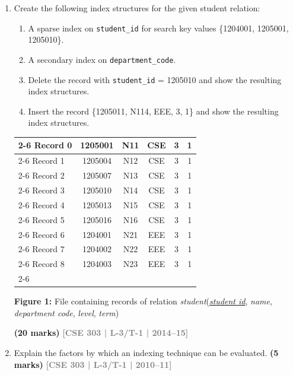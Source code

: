 \documentclass[12pt]{article}
\newcommand{\yr}[1]{\hfill\textcolor{gray}{\small\textbf{[#1]}}}
\newcommand{\mk}[1]{\textcolor{orange!70!black}{\small\textbf{(#1 marks)}}}
\begin{document}
\begin{enumerate}
\item Create the following index structures for the given student relation:
\begin{enumerate}
  \item A sparse index on \texttt{student\_id} for search key values \{1204001, 1205001, 1205010\}.
  \item A secondary index on \texttt{department\_code}.
  \item Delete the record with \texttt{student\_id} = 1205010 and show the resulting index structures.
  \item Insert the record \{1205011, N114, EEE, 3, 1\} and show the resulting index structures.
\end{enumerate}

\begin{center}
  \renewcommand{\arraystretch}{1.3} %
    \begin{tabular}{l |c|c|c|c|c|}
        \cline{2-6}
        Record 0 & 1205001 & N11 & CSE & 3 & 1 \\
        \cline{2-6}
        Record 1 & 1205004 & N12 & CSE & 3 & 1 \\
        \cline{2-6}
        Record 2 & 1205007 & N13 & CSE & 3 & 1 \\
        \cline{2-6}
        Record 3 & 1205010 & N14 & CSE & 3 & 1 \\
        \cline{2-6}
        Record 4 & 1205013 & N15 & CSE & 3 & 1 \\
        \cline{2-6}
        Record 5 & 1205016 & N16 & CSE & 3 & 1 \\
        \cline{2-6}
        Record 6 & 1204001 & N21 & EEE & 3 & 1 \\
        \cline{2-6}
        Record 7 & 1204002 & N22 & EEE & 3 & 1 \\
        \cline{2-6}
        Record 8 & 1204003 & N23 & EEE & 3 & 1 \\
        \cline{2-6}
    \end{tabular}
    
    \vspace{0.4cm}
    \textbf{Figure 1:} File containing records of relation \textit{student}(\underline{\textit{student id}}, \textit{name}, \textit{department code}, \textit{level}, \textit{term})

\end{center}

\mk{20} \yr{CSE 303 | L-3/T-1 | 2014--15}


\item Explain the factors by which an indexing technique can be evaluated.
\mk{5} \yr{CSE 303 | L-3/T-1 | 2010--11}


\end{enumerate}
\end{document}
